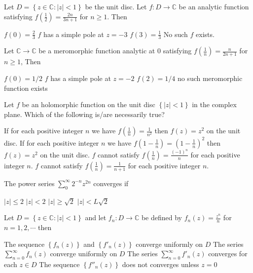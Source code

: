 \documentclass[10pt]{exam}
\newcommand{\C}{\ensuremath{\mathbb{C}}}
\newcommand{\set}[1]{\ensuremath{\left \{ {#1} \right \}}}
\newcommand{\smallb}[1]{\ensuremath{\left ( {#1} \right )}}
\begin{document}
\begin{questions}
\question 
Let $D = \set{z \in \C : |z| < 1}$  be the unit disc. Let $f:D \rightarrow \C$ be an analytic function satisfying $f \smallb{\frac{1}{2}} = \frac{2n}{3n + 1} $ for $n \geq 1$. Then 

\begin{oneparcheckboxes}
\choice $f(0) = \frac{2}{3}$
\choice $f$ has a simple pole at $z = -3$ 
\choice $f(3) = \frac{1}{3}$ 
\choice No such $f$ exists.
\end{oneparcheckboxes}


\question 
Let $\C \rightarrow \C$ be a meromorphic function analytic at $0$ satisfying $f\smallb{\frac{1}{n}} = \frac{n}{2n+1} $ for $n \geq 1$, Then 

\begin{checkboxes}
\choice $f(0) = 1/2$ 
\choice $f$ has a simple pole at $z = -2$ 
\choice $f(2) = 1/4$ 
\choice no such meromorphic function exists 
\end{checkboxes}

\question 
Let $f$ be an holomorphic function on the unit disc $\set{|z| < 1}$ in the complex plane. Which of the following is/are necessarily true?

\begin{checkboxes}
\choice If for each positive integer $n$  we have $f\smallb{\frac{1}{n}} = \frac{1}{n^2}$ then $f(z) = z^2 $ on the unit disc. 
\choice If for each positive integer $n$  we have $f\smallb{1 - \frac{1}{n}} = \smallb{1 - \frac{1}{n}}^2$ then $f(z) = z^2 $ on the unit disc. 
\choice $f$ cannot satisfy  $f\smallb{\frac{1}{n}} = \frac{(-1)^n}{n}$ for each positive integer $n$. 
\choice $f$ cannot satisfy  $f\smallb{\frac{1}{n}} = \frac{1}{n + 1}$ for each positive integer $n$. 
\end{checkboxes}

\question 
The power series $\sum_0^{\infty} 2^{-n}z^{2n}$ converges if 

\begin{oneparchoices}
\choice $|z| \leq 2 $
\choice $|z| < 2 $
\choice $|z| \geq \sqrt{2} $
\choice $|z| <L \sqrt{2} $
\end{oneparchoices}

\question 
Let $D = \set{z \in \C : |z| < 1}$ and let $f_n : D \rightarrow \C$ be defined by $f_n(z) = \frac{z^n}{n}$ for $n = 1,2, \cdots $ then 

\begin{choices}
\choice The sequence $\set{f_n(z)}$ and $\set{f'_n(z)}$ converge uniformly on $D$ 
\choice The series $\sum_{n = 0}^{\infty} f_n(z)$  converge uniformly on $D$ 
\choice The series $\sum_{n = 0}^{\infty} f'_n(z)$  converges for each  $z \in D$ 
\choice The sequence $\set{f''_n(z)}$ does not  converges unless   $z =0$ 
\end{choices}


\end{questions}
\end{document}
